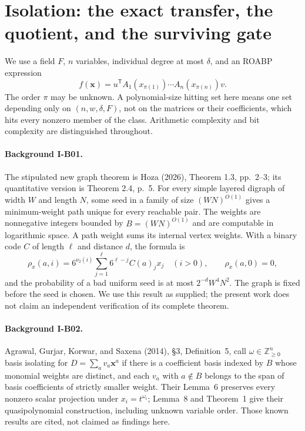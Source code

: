 \documentclass[11pt,a4paper]{article}
\theoremstyle{definition}\newtheorem{definition}{Definition}
\begin{document}
\section{Isolation: the exact transfer, the quotient, and the surviving gate}
\label{sec:isolation-track}

We use a field $F$, $n$ variables, individual degree at most $\delta$, and
an ROABP expression
\[
 f(\mathbf x)=u^{\mathsf T}A_1(x_{\pi(1)})\cdots A_n(x_{\pi(n)})v.
\]
The order $\pi$ may be unknown.  A polynomial-size hitting set here means
one set depending only on $(n,w,\delta,F)$, not on the matrices or their
coefficients, which hits every nonzero member of the class.  Arithmetic
complexity and bit complexity are distinguished throughout.

\paragraph{Background I-B01.}
The stipulated new graph theorem is Hoza (2026), Theorem 1.3, pp.~2--3;
its quantitative version is Theorem 2.4, p.~5.  For every simple layered
digraph of width $W$ and length $N$, some seed in a family of size
$(WN)^{O(1)}$ gives a minimum-weight path unique for every reachable pair.
The weights are nonnegative integers bounded by $B=(WN)^{O(1)}$ and are
computable in logarithmic space.  A path weight sums its internal vertex
weights.  With a binary code $C$ of length $\ell$ and distance $d$, the
formula is
\[
 \rho_x(a,i)=6^{\nu_2(i)}\sum_{j=1}^{\ell}6^{\ell-j}C(a)_j x_j
 \quad(i>0),\qquad \rho_x(a,0)=0,
\tag{I.1}\label{eq:I-hoza}
\]
and the probability of a bad uniform seed is at most
$2^{-d}W^4N^2$.  The graph is fixed before the seed is chosen.
We use this result as supplied; the present work does not claim an
independent verification of its complete theorem.

\paragraph{Background I-B02.}
Agrawal, Gurjar, Korwar, and Saxena (2014), \S3, Definition~5, call
$\omega\in\mathbb Z_{\geq0}^{n}$ basis isolating for
$D=\sum_a v_a\mathbf x^a$ if there is a coefficient basis indexed by $B$
whose monomial weights are distinct, and each $v_a$ with $a\notin B$
belongs to the span of basis coefficients of strictly smaller weight.
Their Lemma~6 preserves every nonzero scalar projection under
$x_i=t^{\omega_i}$; Lemma~8 and Theorem~1 give their quasipolynomial
construction, including unknown variable order.  Those known results
are cited, not claimed as findings here.
\end{document}
